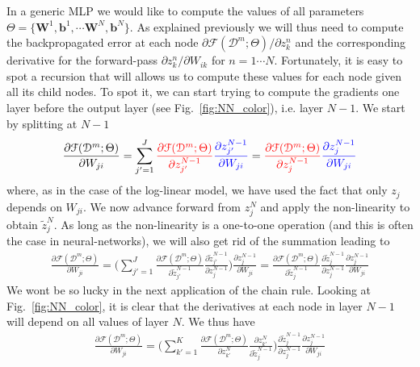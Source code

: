 In a generic MLP we would like to compute the values of all parameters $\Theta=\{\mathbf{W}^1, \mathbf{b}^1, \cdots \mathbf{W}^N, \mathbf{b}^N\}$. As explained previously we will thus need to compute the backpropagated error at each node $\partial \mathcal{F}(\mathcal{D}^m;\Theta)/\partial z_k^n$ and the corresponding derivative for the forward-pass $\partial z_k^n/\partial W_{ik}$ for $n = 1 \cdots N$. Fortunately, it is easy to spot a recursion that will allows us to compute these values for each node given all its child nodes. To spot it, we can start trying to compute the gradients one layer before the output layer (see Fig.~\ref{fig:NN_color}), i.e. layer $N-1$. We start by splitting at $N-1$
%
\begin{align}
\frac{\partial \mathcal{F}(\mathcal{D}^m;\Theta)}{\partial W_{ji}} = \sum_{j'=1}^{J} {\color{red} \frac{\partial \mathcal{F}(\mathcal{D}^m;\Theta)}{\partial z_{j'}^{N-1}}} {\color{blue} \frac{\partial z_{j'}^{N-1}}{\partial W_{ji}}} = {\color{red} \frac{\partial \mathcal{F}(\mathcal{D}^m;\Theta)}{\partial z_{j}^{N-1}}} {\color{blue} \frac{\partial z_{j}^{N-1}}{\partial W_{ji}}}
\label{eq:BPderivation1}
\end{align}
%
where, as in the case of the log-linear model, we have used the fact that only $z_j$ depends on $W_{ji}$. We now advance forward from $z^N_j$ and apply the non-linearity to obtain $\tilde{z}^N_j$. As long as the non-linearity is a one-to-one operation (and this is often the case in neural-networks), we will also get rid of the summation leading to
%
\begin{align}
\frac{\partial \mathcal{F}(\mathcal{D}^m;\Theta)}{\partial W_{ji}} = \bigg(\sum_{j'=1}^{J} \frac{\partial \mathcal{F}(\mathcal{D}^m;\Theta)}{\partial \tilde{z}_{j'}^{N-1}} \frac{\partial \tilde{z}_{j'}^{N-1}}{\partial z_{j}^{N-1}}\bigg) \frac{\partial z_{j}^{N-1}}{\partial W_{ji}}= \frac{\partial \mathcal{F}(\mathcal{D}^m;\Theta)}{\partial \tilde{z}_{j}^{N-1}}\frac{\partial \tilde{z}_{j}^{N-1}}{\partial z_{j}^{N-1}}\frac{\partial z_{j}^{N-1}}{\partial W_{ji}}
\label{eq:BPderivation2}
\end{align}
%
We wont be so lucky in the next application of the chain rule. Looking at Fig.~\ref{fig:NN_color}, it is clear that the derivatives at each node in layer $N-1$ will depend on all values of layer $N$. We thus have
%
\begin{align}
\frac{\partial \mathcal{F}(\mathcal{D}^m;\Theta)}{\partial W_{ji}} = \bigg(\sum_{k'=1}^{K} \frac{\partial \mathcal{F}(\mathcal{D}^m;\Theta)}{\partial z_{k'}^{N}} \frac{\partial z_{k'}^{N}}{\partial \tilde{z}_{j}^{N-1}}\bigg)\frac{\partial \tilde{z}_{j}^{N-1}}{\partial z_{j}^{N-1}}\frac{\partial z_{j}^{N-1}}{\partial W_{ji}}
\label{eq:BPderivation3}
\end{align}

